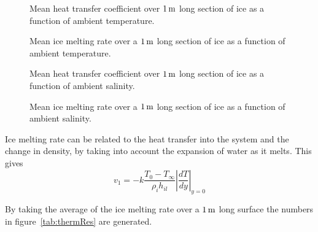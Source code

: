 	\begin{figure}[h]
		\begin{center}
			\setlength\figureheight{6cm} 
			\setlength\figurewidth{9cm} 
			
		\end{center}
		\caption{Mean heat transfer coefficient over $\unit[1]{m}$ long section of ice as a function of ambient temperature.}
		\label{fig:h_Tinf}
	\end{figure}
	
	\begin{figure}[h]
		\begin{center}
			\setlength\figureheight{6cm} 
			\setlength\figurewidth{9cm} 
			
		\end{center}
		\caption{Mean ice melting rate over a $\unit[1]{m}$ long section of ice as a function of ambient temperature.}
		\label{fig:Mdot_Tinf}
	\end{figure}

	\begin{figure}[h]
		\begin{center}
			\setlength\figureheight{6cm} 
			\setlength\figurewidth{9cm} 
			
		\end{center}
		\caption{Mean heat transfer coefficient over $\unit[1]{m}$ long section of ice as a function of ambient salinity.}
		\label{fig:h_sinf}
	\end{figure}

	\begin{figure}[h]
		\begin{center}
			\setlength\figureheight{6cm} 
			\setlength\figurewidth{9cm} 
			
		\end{center}
		\caption{Mean ice melting rate over a $\unit[1]{m}$ long section of ice as a function of ambient salinity.}
		\label{fig:Mdot_sinf}
	\end{figure}


	Ice melting rate can be related to the heat transfer into the system and the change in density, by taking into account the expansion of water as it melts. This gives
	\begin{equation*}
	  v_1 = -k\frac{T_0-T_{\infty}}{\rho_i h_{il}} \left| \frac{dT}{dy} \right|_{y=0}
	\end{equation*}

	By taking the average of the ice melting rate over a $\unit[1]{m}$ long surface the numbers in figure~\ref{tab:thermRes} are generated.


